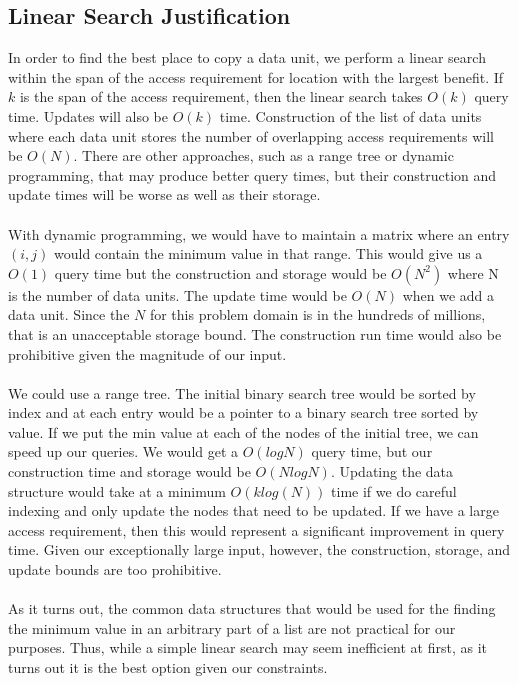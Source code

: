 \begin{appendix}

\section{Linear Search Justification}

In order to find the best place to copy a data unit, we perform a linear search within the span of the access requirement for location with the largest benefit. If $k$ is the span of the access requirement, then the linear search takes $O(k)$ query time. Updates will also be $O(k)$ time. Construction of the list of data units where each data unit stores the number of overlapping access requirements will be $O(N)$. There are other approaches, such as a range tree or dynamic programming, that may produce better query times, but their construction and update times will be worse as well as their storage. \\
\\
With dynamic programming, we would have to maintain a matrix where an entry
$(i,j)$ would contain the minimum value in that range. This would give us a
$O(1)$ query time but the construction and storage would be $O(N^2)$ where N is
the number of data units. The update time would be $O(N)$ when we add a data
unit. Since the $N$ for this problem domain is in the hundreds of millions,
that is an unacceptable storage bound. The construction run time would also be
prohibitive given the magnitude of our input. \\
\\
We could use a range tree. The initial binary search tree would be sorted by
index and at each entry would be a pointer to a binary search tree sorted by
value. If we put the min value at each of the nodes of the initial tree, we can
speed up our queries. We would get a $O(log N)$ query time, but our
construction time and storage would be $O(N log N)$. Updating the data
structure would take at a minimum $O(k log(N))$ time if we do careful indexing
and only update the nodes that need to be updated. If we have a large access
requirement, then this would represent a significant improvement in query time.
Given our exceptionally large input, however, the construction, storage, and
update bounds are too prohibitive.  \\
\\
As it turns out, the common data structures that would be used for the finding the minimum value in an arbitrary part of a list are not practical for our purposes. Thus, while a simple linear search may seem inefficient at first, as it turns out it is the best option given our constraints. 

\end{appendix}
